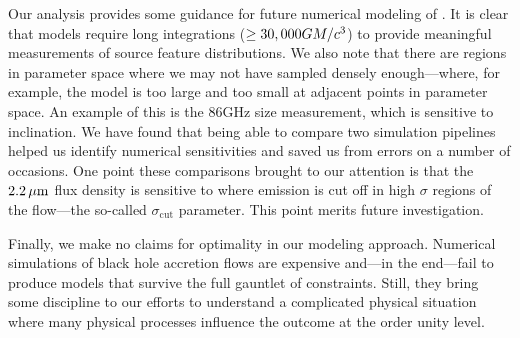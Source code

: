 Our analysis provides some guidance for future numerical modeling of \sgra.  It is clear that models require long integrations ($\ge 30,000 GM/c^3$) to provide meaningful measurements of source feature distributions.  We also note that there are regions in parameter space where we may not have sampled densely enough---where, for example, the model is too large and too small at adjacent points in parameter space.  An example of this is the 86GHz size measurement, which is sensitive to inclination.  We have found that being able to compare two simulation pipelines helped us identify numerical sensitivities and saved us from errors on a number of occasions.  One point these comparisons brought to our attention is that the $2.2\,\mu\mathrm{m}$ flux density is sensitive to where emission is cut off in high $\sigma$ regions of the flow---the so-called $\sigma_\mathrm{cut}$ parameter.  This point merits future investigation.

Finally, we make no claims for optimality in our modeling approach.  Numerical simulations of black hole accretion flows are expensive and---in the end---fail to produce models that survive the full gauntlet of constraints.  Still, they bring some discipline to our efforts to understand a complicated physical situation where many physical processes influence the outcome at the order unity level.
